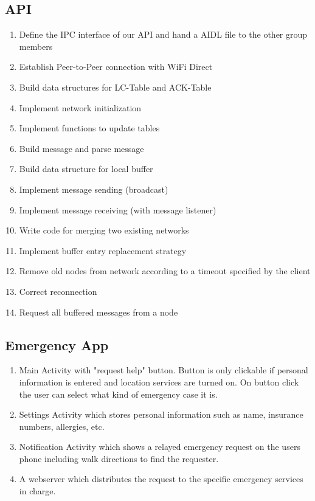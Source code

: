 	
\subsection{API}


\begin{enumerate}

\item Define the IPC interface of our API and hand a AIDL\cite{AIDL} file to the other group members
\item Establish Peer-to-Peer connection with WiFi Direct
\item Build data structures for LC-Table and ACK-Table
\item Implement network initialization
\item Implement functions to update tables
\item Build message and parse message
\item Build data structure for local buffer
\item Implement message sending (broadcast)
\item Implement message receiving (with message listener)
\item Write code for merging two existing networks
\item Implement buffer entry replacement strategy
\item Remove old nodes from network according to a timeout specified by the client
\item Correct reconnection
\item Request all buffered messages from a node
\end{enumerate}
		
\subsection{Emergency App}
	\begin{enumerate}
		\item Main Activity with "request help" button. Button is only clickable if personal information is entered and location services are turned on. On button click the user can select what kind of emergency case it is.
		\item Settings Activity which stores personal information such as name, insurance numbers, allergies, etc.
		\item Notification Activity which shows a relayed emergency request on the users phone including walk directions to find the requester.
		\item A webserver which distributes the request to the specific emergency services in charge.
	\end{enumerate}
		
